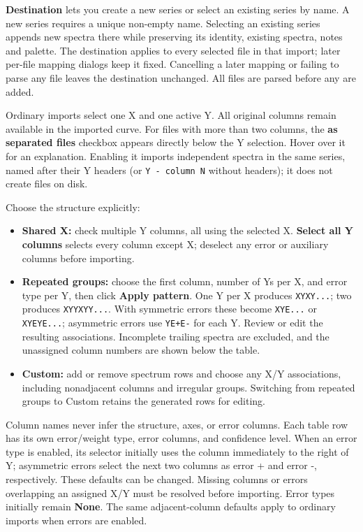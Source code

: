 \documentclass[
  10pt,
  a4paper,
  oneside]{scrreprt}
\providecommand{\tightlist}{%
  \setlength{\itemsep}{0pt}\setlength{\parskip}{0pt}}
\begin{document}
\textbf{Destination} lets you create a new series or select an existing
series by name. A new series requires a unique non-empty name. Selecting
an existing series appends new spectra there while preserving its
identity, existing spectra, notes and palette. The destination applies
to every selected file in that import; later per-file mapping dialogs
keep it fixed. Cancelling a later mapping or failing to parse any file
leaves the destination unchanged. All files are parsed before any are
added.

Ordinary imports select one X and one active Y. All original columns
remain available in the imported curve. For files with more than two
columns, the \textbf{as separated files} checkbox appears directly below
the Y selection. Hover over it for an explanation. Enabling it imports
independent spectra in the same series, named after their Y headers (or
\texttt{Y\ -\ column\ N} without headers); it does not create files on
disk.

Choose the structure explicitly:

\begin{itemize}
\tightlist
\item
  \textbf{Shared X:} check multiple Y columns, all using the selected X.
  \textbf{Select all Y columns} selects every column except X; deselect
  any error or auxiliary columns before importing.
\item
  \textbf{Repeated groups:} choose the first column, number of Ys per X,
  and error type per Y, then click \textbf{Apply pattern}. One Y per X
  produces \texttt{XYXY...}; two produces \texttt{XYYXYY...}. With
  symmetric errors these become \texttt{XYE...} or \texttt{XYEYE...};
  asymmetric errors use \texttt{YE+E-} for each Y. Review or edit the
  resulting associations. Incomplete trailing spectra are excluded, and
  the unassigned column numbers are shown below the table.
\item
  \textbf{Custom:} add or remove spectrum rows and choose any X/Y
  associations, including nonadjacent columns and irregular groups.
  Switching from repeated groups to Custom retains the generated rows
  for editing.
\end{itemize}

Column names never infer the structure, axes, or error columns. Each
table row has its own error/weight type, error columns, and confidence
level. When an error type is enabled, its selector initially uses the
column immediately to the right of Y; asymmetric errors select the next
two columns as error + and error -, respectively. These defaults can be
changed. Missing columns or errors overlapping an assigned X/Y must be
resolved before importing. Error types initially remain \textbf{None}.
The same adjacent-column defaults apply to ordinary imports when errors
are enabled.
\end{document}

